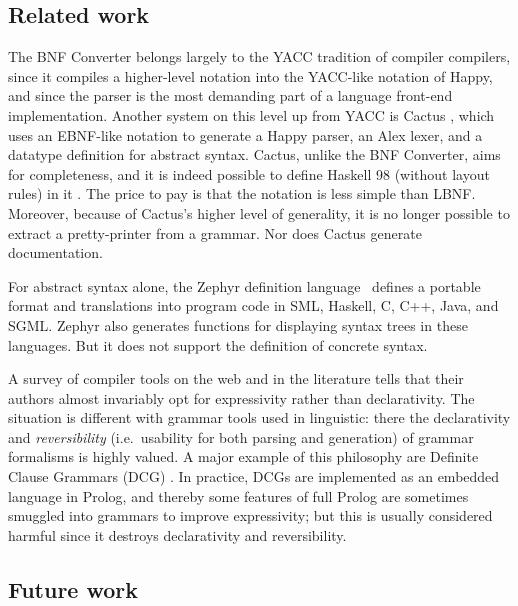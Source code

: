 \documentclass[10pt]{article}
\begin{document}
\subsection{Related work}

The BNF Converter belongs largely to the YACC \cite{johnson-yacc}
tradition of compiler compilers,
since it compiles a higher-level notation into the
YACC-like notation of Happy, and since the parser
is the most demanding part of a language front-end implementation.
Another system on this
level up from YACC is Cactus \cite{Cactus},
which uses an EBNF-like notation to
generate a Happy parser, an Alex lexer,
and a datatype definition for abstract syntax.
Cactus, unlike the BNF Converter, aims for completeness,
and it is indeed possible to define Haskell 98 (without layout rules) in it
\cite{haskell98-Cactus}. The price to pay is that the
notation is less simple than LBNF. Moreover, because of Cactus's
higher level of generality, it is no
longer possible to extract a
pretty-printer from a grammar. Nor does Cactus
generate documentation.

For abstract syntax alone, the Zephyr definition language \cite{zephyr}\ defines
a portable format and translations into program code in SML, Haskell, C, C++,
Java, and SGML. Zephyr also generates functions for displaying syntax trees
in these languages. But it does not support the definition of concrete syntax.

A survey of compiler tools on the web and in the literature tells that their
authors almost invariably opt for expressivity rather than declarativity.
The situation is different with grammar tools used in linguistic: there
the declarativity and \textit{reversibility} (i.e.\ usability for both
parsing and generation) of grammar formalisms is highly valued. A major
example of this philosophy are Definite Clause Grammars (DCG) \cite{dcg}.
In practice, DCGs are implemented as an embedded language in Prolog, and thereby
some features of full Prolog are sometimes smuggled into grammars to improve
expressivity; but this is usually considered harmful since it destroys
declarativity and reversibility.



\subsection{Future work}
\end{document}
